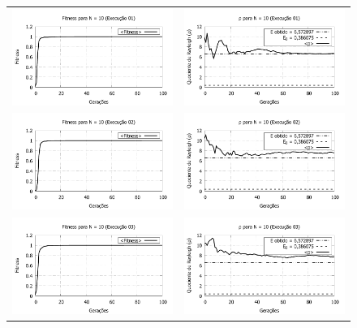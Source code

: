 \begin{figure}[phtb]
\centering
  \begin{tabular}{@{}cc@{}}
    \includegraphics[width=.40\textwidth]{figs/resultados/fitnessGrad/N10_01_fitness.pdf} &
    \includegraphics[width=.40\textwidth]{figs/resultados/fitnessGrad/N10_01_rho.pdf}   \\
		\includegraphics[width=.40\textwidth]{figs/resultados/fitnessGrad/N10_02_fitness.pdf} &
    \includegraphics[width=.40\textwidth]{figs/resultados/fitnessGrad/N10_02_rho.pdf}   \\
		\includegraphics[width=.40\textwidth]{figs/resultados/fitnessGrad/N10_03_fitness.pdf} &
    \includegraphics[width=.40\textwidth]{figs/resultados/fitnessGrad/N10_03_rho.pdf}   \\

\end{tabular}
\end{figure}
